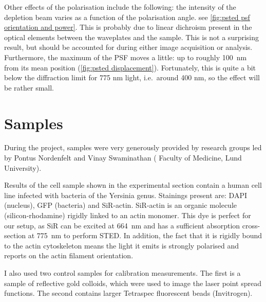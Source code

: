 Other effects of the polarisation include the following: the intensity of the depletion beam varies as a function of the polarisation angle. see \autoref{fig:psted psf orientation and power}. This is probably due to linear dichroism present in the optical elements between the waveplates and the sample. This is not a surprising result, but should be accounted for during either image acquisition or analysis. Furthermore, the maximum of the PSF moves a little: up to roughly 100~nm from its mean position (\autoref{fig:psted displacement}). Fortunately, this is quite a bit below the diffraction limit for 775 nm light, i.e.~around 400 nm, so the effect will be rather small.

\section{Samples}
\label{sec:samples}

During the project, samples were very generously provided by research groups led by Pontus Nordenfelt and Vinay Swaminathan (%
Faculty of Medicine, Lund University).

Results of the cell sample shown in the experimental section contain a human cell line infected with bacteria of the Yersinia genus. Stainings present are: DAPI (nucleus), GFP (bacteria) and SiR-actin. SiR-actin is an organic molecule (silicon-rhodamine) rigidly linked to an actin monomer. This dye is perfect for our setup, as SiR can be excited at 664~nm and has a sufficient absorption cross-section at 775~nm to perform STED. In addition, the fact that it is rigidly bound to the actin cytoskeleton means the light it emits is strongly polarised and reports on the actin filament orientation.

I also used two control samples for calibration measurements. The first is a sample of reflective gold colloids, which were used to image the laser point spread functions. The second contains larger Tetraspec fluorescent beads (Invitrogen).